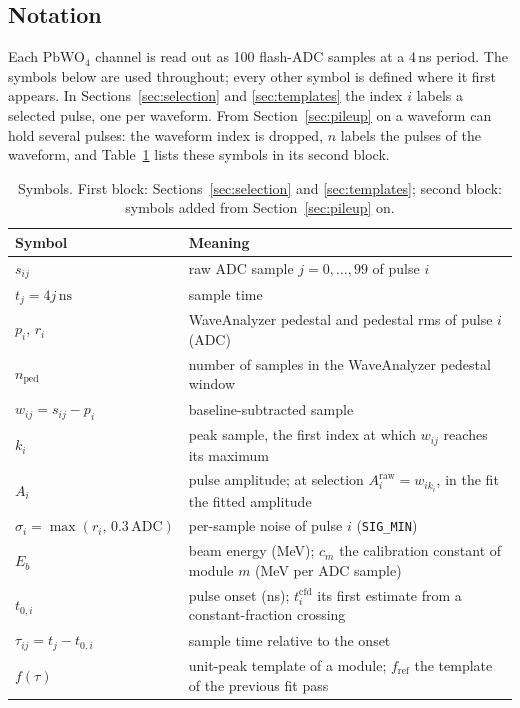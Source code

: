\documentclass[11pt]{article}
\newcommand{\ns}{\,\mathrm{ns}}
\newcommand{\adc}{\,\mathrm{ADC}}
\newcommand{\code}[1]{\texttt{#1}}
\begin{document}
\subsection{Notation}
\label{sec:notation}

Each PbWO$_4$ channel is read out as 100 flash-ADC samples at a 4\,ns period. The symbols below are used throughout; every other symbol is defined where it first appears. In Sections~\ref{sec:selection} and \ref{sec:templates} the index $i$ labels a selected pulse, one per waveform. From Section~\ref{sec:pileup} on a waveform can hold several pulses: the waveform index is dropped, $n$ labels the pulses of the waveform, and Table~\ref{tab:notation} lists these symbols in its second block.

\begin{table}[htbp]
\centering
\caption{Symbols. First block: Sections~\ref{sec:selection} and \ref{sec:templates}; second block: symbols added from Section~\ref{sec:pileup} on.}
\label{tab:notation}
\small
\begin{tabular}{lp{}}
\toprule
Symbol & Meaning \\
\midrule
$s_{ij}$ & raw ADC sample $j = 0,\dots,99$ of pulse $i$ \\
$t_j = 4j\ns$ & sample time \\
$p_i$, $r_i$ & WaveAnalyzer pedestal and pedestal rms of pulse $i$ (ADC) \\
$n_{\mathrm{ped}}$ & number of samples in the WaveAnalyzer pedestal window \\
$w_{ij} = s_{ij} - p_i$ & baseline-subtracted sample \\
$k_i$ & peak sample, the first index at which $w_{ij}$ reaches its maximum \\
$A_i$ & pulse amplitude; at selection $A_i^{\mathrm{raw}} = w_{ik_i}$, in the fit the fitted amplitude \\
$\sigma_i = \max(r_i,\,0.3\adc)$ & per-sample noise of pulse $i$ (\code{SIG\_MIN}) \\
$E_b$ & beam energy (MeV); $c_m$ the calibration constant of module $m$ (MeV per ADC sample) \\
$t_{0,i}$ & pulse onset (ns); $t^{\mathrm{cfd}}_i$ its first estimate from a constant-fraction crossing \\
$\tau_{ij} = t_j - t_{0,i}$ & sample time relative to the onset \\
$f(\tau)$ & unit-peak template of a module; $f_{\mathrm{ref}}$ the template of the previous fit pass \\

\end{tabular}
\end{table}
\end{document}
